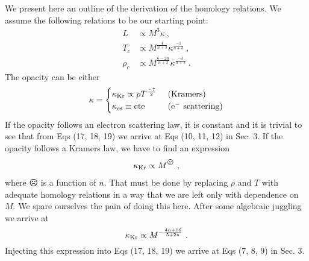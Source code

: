 
We present here an outline of the derivation of the homology relations. We assume the following relations to be our starting point:
\begin{align}
    L      & \propto M^3 \kappa \ ,                                   \\
    T_c    & \propto M^{\frac{4}{n+3}} \kappa^{\frac{-1}{n+3}} \ ,    \\
    \rho_c & \propto M^{\frac{6-2n}{n+3}} \kappa^{\frac{-3}{n+3}} \ .
\end{align}
The opacity can be either
\begin{align}
    \kappa =
    \begin{cases}
        \kappa_{\rm Kr} \propto \rho T^{\frac{-7}{2}} \  & \text{(Kramers)}                     \\
        \kappa_{\rm es} \equiv {\rm cte}                 & \text{(e$^{-} \ \text{scattering}$)} \\
    \end{cases}
\end{align}
If the opacity follows an electron scattering law, it is constant and it is trivial to see that from Eqs (17, 18, 19) we arrive at Eqs (10, 11, 12) in Sec. 3. If the opacity follows a Kramers law, we have to find an expression
\begin{align}
    \kappa_{\rm Kr} \propto M^{\frownie}\ ,
\end{align}
where $\frownie$ is a function of $n$. That must be done by replacing $\rho$ and $T$ with adequate homology relations in a way that we are left only with dependence on $M$. We spare ourselves the pain of doing this here. After some algebraic juggling we arrive at
\begin{equation}
    \kappa_{\rm Kr} \propto M^{-\frac{4n+16}{5+2n}} \ .
    \label{eq:eq}
\end{equation}
Injecting this expression into Eqs (17, 18, 19) we arrive at Eqs (7, 8, 9) in Sec. 3.